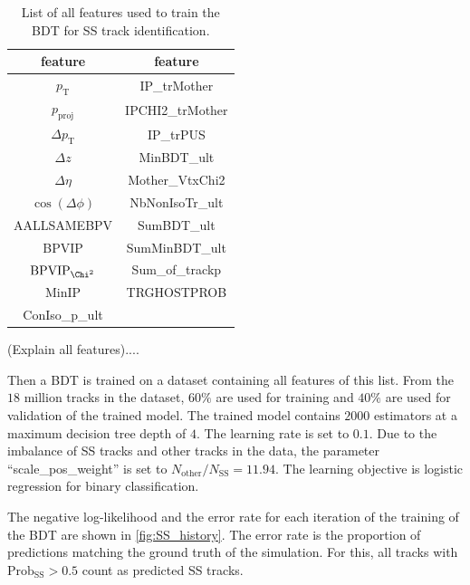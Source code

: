 \begin{table}
    \centering
    \caption{List of all features used to train the BDT for SS track identification.}
    \label{tab:SS_features}
    \begin{tabular}{c c}
        \toprule
        feature & feature \\
        \midrule
        $p_\text{T}$        & IP\_trMother \\ %
        $p_\text{proj}$     & IPCHI2\_trMother \\ %
        $\Delta p_\text{T}$ & IP\_trPUS \\ %
        $\Delta z$          & MinBDT\_ult \\ %
        $\Delta \eta$       & Mother\_VtxChi2 \\ %
        $\cos(\Delta \phi)$ & NbNonIsoTr\_ult \\ %
        AALLSAMEBPV         & SumBDT\_ult \\ %
        BPVIP               & SumMinBDT\_ult \\ %
        $\text{BPVIP}_{\Chi^2}$    & Sum\_of\_trackp \\ %
        MinIP               & TRGHOSTPROB \\ %
        ConIso\_p\_ult      & \\ %
        \bottomrule
    \end{tabular}
\end{table}

(Explain all features)....

Then a BDT is trained on a dataset containing all features of this list.
From the $18$ million tracks in the dataset, $60\%$ are used for training and $40\%$ are used for validation of the trained model.
The trained model contains $2000$ estimators at a maximum decision tree depth of $4$.
The learning rate is set to $0.1$.
Due to the imbalance of SS tracks and other tracks in the data, the parameter \enquote{scale\_pos\_weight} is set to $N_\text{other}/N_\text{SS} = 11.94$.
The learning objective is logistic regression for binary classification.

The negative log-likelihood and the error rate for each iteration of the training of the BDT are shown in \autoref{fig:SS_history}.
The error rate is the proportion of predictions matching the ground truth of the simulation.
For this, all tracks with $\text{Prob}_\text{SS}>0.5$ count as predicted SS tracks. 

